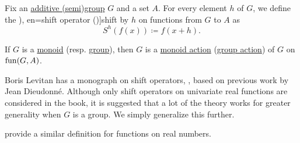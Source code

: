 \begin{definition}\label{def:shift_operator}\mimprovised
  Fix an \hyperref[con:additive_semigroup]{additive (semi)group} \( G \) and a set \( A \). For every element \( h \) of \( G \), we define the \term[ru=оператор сдвига (\cite[9]{Левитан1973ТеорияОператоровОбобщенногоСдвига}), en=shift operator (\cite{Stanley2012EnumerativeCombinatoricsVol1})]{shift} by \( h \) on functions from \( G \) to \( A \) as
  \begin{equation}\label{eq:def:shift_operator}
    S^h(f(x)) \coloneqq f(x + h).
  \end{equation}
\end{definition}
\begin{comments}
  \item If \( G \) is a \hyperref[def:semigroup]{monoid} (resp. \hyperref[def:group]{group}), then \( G \) is a \hyperref[def:monoid_action]{monoid action} (\hyperref[def:group_action]{group action}) of \( G \) on \( \operatorname{fun}(G, A) \).

  \item Boris Levitan has a monograph on shift operators, \cite{Левитан1973ТеорияОператоровОбобщенногоСдвига}, based on previous work by Jean Dieudonné. Although only shift operators on univariate real functions are considered in the book, it is suggested that a lot of the theory works for greater generality when \( G \) is a group. We simply generalize this further.

   provide a similar definition for functions on real numbers.
\end{comments}

